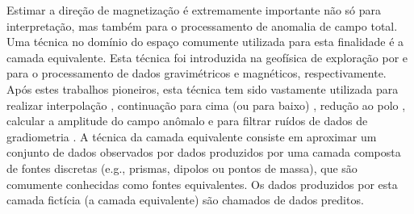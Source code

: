 Estimar a direção de magnetização é extremamente importante não só para interpretação, mas também para o processamento de anomalia de campo total. Uma técnica no domínio do espaço comumente utilizada para esta finalidade é a camada equivalente. Esta técnica foi introduzida na geofísica de exploração por \cite{dampney1969} e \cite{emilia_massey_1974} para o processamento de dados gravimétricos e magnéticos, respectivamente. Após estes trabalhos pioneiros, esta técnica tem sido vastamente utilizada para realizar interpolação \citep{cordell_1992, mendonca-silva_1994, barnes-lumley_2011, siqueira_etal_2017}, continuação para cima (ou para baixo) \citep{hansen_miyazaki_1984, li-oldenburg_2010}, redução ao polo \citep{silva_1986, leao-silva_1989, guspi-novara_2009, oliveirajr-etal_2013}, calcular a amplitude do campo anômalo \citep{li_li_2014} e para filtrar ruídos de dados de gradiometria \citep{martinez_li_2016}. A técnica da camada equivalente consiste em aproximar um conjunto de dados observados por dados produzidos por uma camada composta de fontes discretas (e.g., prismas, dipolos ou pontos de massa), que são comumente conhecidas como fontes equivalentes. Os dados produzidos por esta camada fictícia (a camada equivalente) são chamados de dados preditos. 

